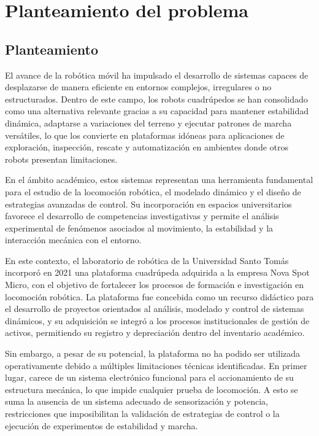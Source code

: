 \chapter{Planteamiento del problema}

\section{Planteamiento}

El avance de la robótica móvil ha impulsado el desarrollo de sistemas capaces de desplazarse de manera eficiente en entornos complejos, irregulares o no estructurados. Dentro de este campo, los robots cuadrúpedos se han consolidado como una alternativa relevante gracias a su capacidad para mantener estabilidad dinámica, adaptarse a variaciones del terreno y ejecutar patrones de marcha versátiles, lo que los convierte en plataformas idóneas para aplicaciones de exploración, inspección, rescate y automatización en ambientes donde otros robots presentan limitaciones.

En el ámbito académico, estos sistemas representan una herramienta fundamental para el estudio de la locomoción robótica, el modelado dinámico y el diseño de estrategias avanzadas de control. Su incorporación en espacios universitarios favorece el desarrollo de competencias investigativas y permite el análisis experimental de fenómenos asociados al movimiento, la estabilidad y la interacción mecánica con el entorno.

En este contexto, el laboratorio de robótica de la Universidad Santo Tomás incorporó en 2021 una plataforma cuadrúpeda adquirida a la empresa Nova Spot Micro, con el objetivo de fortalecer los procesos de formación e investigación en locomoción robótica. La plataforma fue concebida como un recurso didáctico para el desarrollo de proyectos orientados al análisis, modelado y control de sistemas dinámicos, y su adquisición se integró a los procesos institucionales de gestión de activos, permitiendo su registro y depreciación dentro del inventario académico.

Sin embargo, a pesar de su potencial, la plataforma no ha podido ser utilizada operativamente debido a múltiples limitaciones técnicas identificadas. En primer lugar, carece de un sistema electrónico funcional para el accionamiento de su estructura mecánica, lo que impide cualquier prueba de locomoción. A esto se suma la ausencia de un sistema adecuado de sensorización y potencia, restricciones que imposibilitan la validación de estrategias de control o la ejecución de experimentos de estabilidad y marcha.

